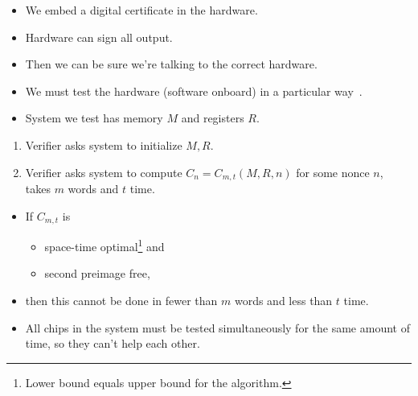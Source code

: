 \begin{frame}
  \begin{example}
    \begin{itemize}
      \item We embed a digital certificate in the hardware.
      \item Hardware can sign all output.
      \item Then we can be sure we're talking to the correct hardware.
    \end{itemize}
  \end{example}
\end{frame}

\begin{frame}
  \begin{example}
    \begin{itemize}
      \item We must test the hardware (software onboard) in a particular 
        way~\cite{EstablishRootOfTrustUnconditionally}.

      \item System we test has memory \(M\) and registers \(R\).
    \end{itemize}
    \begin{enumerate}
      \item Verifier asks system to initialize \(M, R\).

      \item Verifier asks system to compute \(C_n = C_{m,t}(M, R, n)\) for some 
        nonce \(n\), takes \(m\) words and \(t\) time.
    \end{enumerate}
  \end{example}
\end{frame}

\begin{frame}
  \begin{remark}
    \begin{itemize}
      \item If \(C_{m,t}\) is
        \begin{itemize}
          \item space-time optimal\footnote{%
              Lower bound equals upper bound for the algorithm.
            } and
          \item second preimage free,
        \end{itemize}
      \item then this cannot be done in fewer than \(m\) words and less than 
        \(t\) time.
      \item All chips in the system must be tested simultaneously for the same 
        amount of time, so they can't help each other.
    \end{itemize}
  \end{remark}
\end{frame}

